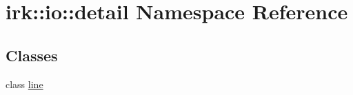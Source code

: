 \hypertarget{namespaceirk_1_1io_1_1detail}{}\section{irk\+:\+:io\+:\+:detail Namespace Reference}
\label{namespaceirk_1_1io_1_1detail}
\subsection*{Classes}
\begin{DoxyCompactItemize}
\item 
class \mbox{\hyperlink{classirk_1_1io_1_1detail_1_1line}{line}}
\end{DoxyCompactItemize}
